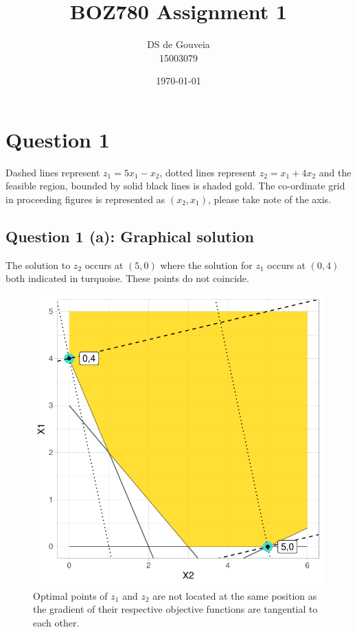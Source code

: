 \documentclass[a4paper,11pt]{article}
\title{BOZ780 Assignment 1}
\author{DS de Gouveia \\ 15003079}
\date{\today}
\begin{document}
\maketitle
\tableofcontents

\newpage

\section{Question 1}
Dashed lines represent $z_1=5x_1-x_2$, dotted lines represent $z_2=x_1+4x_2$ and the feasible region, bounded by solid black lines is shaded gold. The co-ordinate grid in proceeding figures is represented as $(x_2,x_1)$, please take note of the axis.
\subsection{Question 1 (a): Graphical solution}
The solution to $z_2$ occurs at $(5,0)$ where the solution for $z_1$ occurs at $(0,4)$ both indicated in turquoise. These points do not coincide.
\begin{figure}[H]
    \centering
    \includegraphics{../R/Optimal_points_Z1_Z2}
    \caption{Optimal points of $z_1$ and $z_2$ are not located at the same position as the gradient of their respective objective functions are tangential to each other.}
    \label{eff_front}
\end{figure}
\newpage
\end{document}
